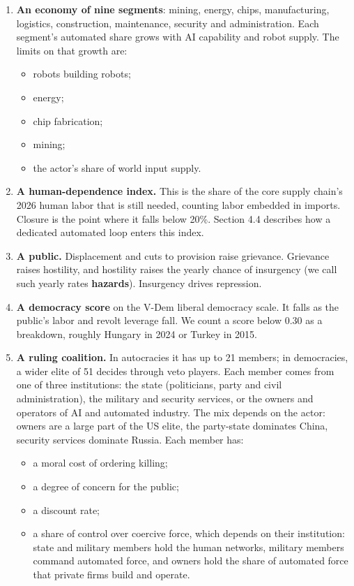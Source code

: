 \documentclass[
  10pt,
]{article}
\providecommand{\tightlist}{%
  \setlength{\itemsep}{0pt}\setlength{\parskip}{0pt}}
\begin{document}
\begin{enumerate}
\def\labelenumi{\arabic{enumi}.}
\item
  \textbf{An economy of nine segments}: mining, energy, chips, manufacturing, logistics,
  construction, maintenance, security and administration. Each segment's automated share grows with
  AI capability and robot supply. The limits on that growth are:

  \begin{itemize}
  \tightlist
  \item
    robots building robots;
  \item
    energy;
  \item
    chip fabrication;
  \item
    mining;
  \item
    the actor's share of world input supply.
  \end{itemize}
\item
  \textbf{A human-dependence index.} This is the share of the core supply chain's 2026 human labor
  that is still needed, counting labor embedded in imports. Closure is the point where it falls
  below 20\%. Section 4.4 describes how a dedicated automated loop enters this index.
\item
  \textbf{A public.} Displacement and cuts to provision raise grievance. Grievance raises hostility,
  and hostility raises the yearly chance of insurgency (we call such yearly rates \textbf{hazards}).
  Insurgency drives repression.
\item
  \textbf{A democracy score} on the V-Dem liberal democracy scale. It falls as the public's labor
  and revolt leverage fall. We count a score below 0.30 as a breakdown, roughly Hungary in 2024 or
  Turkey in 2015.
\item
  \textbf{A ruling coalition.} In autocracies it has up to 21 members; in democracies, a wider elite
  of 51 decides through veto players. Each member comes from one of three institutions: the state
  (politicians, party and civil administration), the military and security services, or the owners
  and operators of AI and automated industry. The mix depends on the actor: owners are a large part
  of the US elite, the party-state dominates China, security services dominate Russia. Each member
  has:

  \begin{itemize}
  \tightlist
  \item
    a moral cost of ordering killing;
  \item
    a degree of concern for the public;
  \item
    a discount rate;
  \item
    a share of control over coercive force, which depends on their institution: state and military
    members hold the human networks, military members command automated force, and owners hold the
    share of automated force that private firms build and operate.
  \end{itemize}


\end{enumerate}
\end{document}
